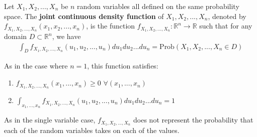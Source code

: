 \documentclass[12pt]{article}
\begin{document}
Let $X_1, X_2, ..., X_n$ be $n$ random variables all defined on the same probability space. The \textbf{joint continuous density function} of $X_1, X_2, ..., X_n$, denoted by $f_{X_1, X_2, ..., X_n}(x_1,x_2,...,x_n)$, is the function
$f_{X_1, X_2, ..., X_n}: \mathbb{R}^n \to \mathbb{R}$ such that for any domain $D\subset \mathbb{R}^n$, we have
\begin{align*}
\int_D  {  f_{X_1,X_2,..., X_n}(u_1,u_2,...,u_n) du_1 du_2 ... du_n  } = \text{Prob}({X_1,X_2,...,X_n}\in D)
\end{align*}
\par
As in the case where $n=1$, this function satisfies:\\
\par
\begin{enumerate}
\item $f_{X_1, X_2, ..., X_n}(x_1,...,x_n) \geq  0$    $\forall (x_1,...,x_n)$
\item $\int_{x_1, ... ,x_n}^{} {  f_{X_1, X_2, ..., X_n}(u_1,u_2,...,u_n) du_1 du_2 ... du_n }= 1$
\end{enumerate}
\par
As in the single variable case, $f_{X_1, X_2, ..., X_n}$ does not represent the probability that each of the random variables takes on each of the values.
\end{document}

